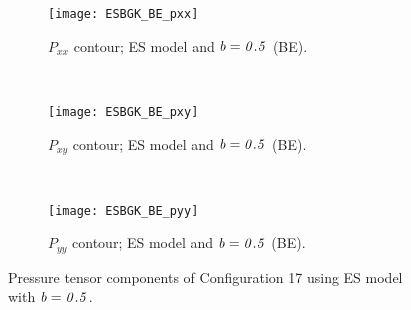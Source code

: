 \documentclass{rsproca}%
\begin{document}
\begin{figure}
        \centering
        \begin{subfigure}[b]{0.32\textwidth}
                \centering
                \texttt{[image: ESBGK\_BE\_pxx]}
                \caption{$P_{xx}$ contour; ES model and $\it{b=0.5}$ (BE).}
                \label{fig:ESBGK_BE_pxx}
        \end{subfigure}%
        ~ %
        \begin{subfigure}[b]{0.32\textwidth}
                \centering
                \texttt{[image: ESBGK\_BE\_pxy]}
                \caption{$P_{xy}$ contour; ES model and $\it{b=0.5}$ (BE).}
                \label{fig:ESBGK_BE_pxy}
        \end{subfigure}
        ~ %
        \begin{subfigure}[b]{0.32\textwidth}
                \centering
                \texttt{[image: ESBGK\_BE\_pyy]}
                \caption{$P_{yy}$ contour; ES model and $\it{b=0.5}$ (BE).}
                \label{fig:ESBGK_BE_pyy}
        \end{subfigure}
        \caption{Pressure tensor components of Configuration 17 using ES model with $\it{b=0.5}$.}
				\label{fig:conf5_pTensor_BE}
\end{figure}
\end{document}
